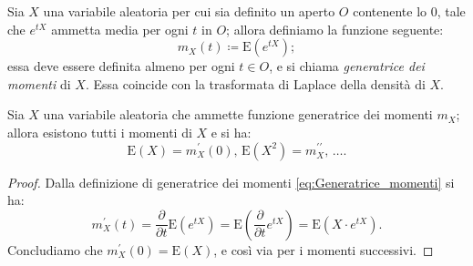         \begin{defn}
            Sia $X$ una variabile aleatoria per cui sia definito un aperto $O$ contenente lo 0, tale che $e^{tX}$ ammetta media per ogni $t$ in $O$; allora definiamo la funzione seguente:
            \begin{equation}\label{eq:Generatrice_momenti}
                m_X(t) \coloneqq \text{E}(e^{tX})
            ;\end{equation}
            essa deve essere definita almeno per ogni $t \in O$, e si chiama \textit{generatrice dei momenti} di $X$.
            Essa coincide con la trasformata di Laplace della densità di $X$.
        \end{defn}
        \begin{prty}
            Sia $X$ una variabile aleatoria che ammette funzione generatrice dei momenti $m_X$; allora esistono tutti i momenti di $X$ e si ha: \[
                \text{E}(X) = m_X^{\prime}(0),\, \text{E}(X^2) = m_X^{\prime\prime},\, \ldots
            .\] 
        \end{prty}
        \begin{proof}
            Dalla definizione di generatrice dei momenti \eqref{eq:Generatrice_momenti} si ha: \[
                m_X^{\prime}(t) = \frac{\partial}{\partial t}\text{E}(e^{tX})
                = \text{E}\left(\frac{\partial}{\partial t} e^{tX}\right)
                = \text{E}(X\cdot e^{tX})
            .\] Concludiamo che $m_X^{\prime}(0) = \text{E}(X)$, e così via per i momenti successivi.
        \end{proof}
